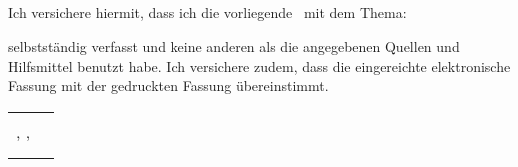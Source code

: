 \begin{center}
	\section*{\declarationHeading}
\end{center}

\noindent Ich versichere hiermit, dass ich die vorliegende \thesisType \ mit dem Thema: \\

\begin{center}
	\thesisTitle
\end{center}

\noindent selbstständig verfasst und keine anderen als die angegebenen Quellen und Hilfsmittel benutzt habe. Ich versichere zudem, dass die eingereichte elektronische Fassung mit der gedruckten Fassung übereinstimmt.

\vspace*{1.8cm}

\begin{tabular}{l c}
	\noindent \declarationLocation, \declarationDate,	 & \noindent\rule{9cm}{0.5pt} \\ & \name \\
\end{tabular} 